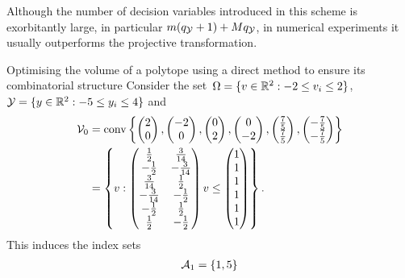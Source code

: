%
Although the number of decision variables introduced in this scheme is exorbitantly large, in particular $m(q_\mathcal Y+1)+Mq_\mathcal Y$, in numerical experiments it usually outperforms the projective transformation.
%
\begin{example}{Optimising the volume of a polytope using a direct method to ensure its combinatorial structure}\label{example:direct:polytope:optimisation}
Consider the set~$\Omega = \{v\in\mathbb R^2:-2\leq v_i\leq 2\}$, $\mathcal Y = \{y\in\mathbb R^2:-5\leq y_i\leq 4\}$ and 
%
$$
\begin{aligned}
\mathcal V_0 &= \text{conv}\left\{\begin{pmatrix}2\\0\end{pmatrix},\begin{pmatrix}-2\\0\end{pmatrix},\begin{pmatrix}0\\2\end{pmatrix},\begin{pmatrix}0\\-2\end{pmatrix},\begin{pmatrix}\frac{7}{5}\\\frac{7}{5}\end{pmatrix},\begin{pmatrix}-\frac{7}{5}\\-\frac{7}{5}\end{pmatrix}\right\}\\
 &= \left\{v:\begin{pmatrix}\frac{1}{2}&\frac{3}{14}\\ -\frac{1}{2}&-\frac{3}{14}\\ \frac{3}{14}&\frac{1}{2}\\ -\frac{3}{14}&-\frac{1}{2}\\ -\frac{1}{2}&\frac{1}{2} \\ \frac{1}{2}&-\frac{1}{2}\end{pmatrix}v\leq\begin{pmatrix}1\\1\\1\\1\\1\\1\end{pmatrix}\right\}.
\end{aligned}
$$
%
This induces the index sets
%
\[\begin{aligned}
\A_1 &= \{1,5\}\\

\end{aligned}\]
\end{example}

